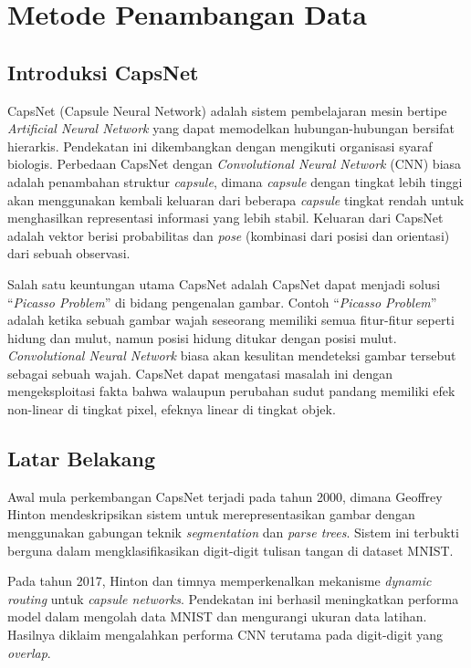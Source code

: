 \documentclass{article}
\begin{document}
   \section{Metode Penambangan Data}
   	\subsection{Introduksi CapsNet}
   	CapsNet (Capsule Neural Network) adalah sistem pembelajaran mesin bertipe \textit{Artificial Neural Network} yang dapat memodelkan hubungan-hubungan bersifat hierarkis. Pendekatan ini dikembangkan dengan mengikuti organisasi syaraf biologis. Perbedaan CapsNet dengan \textit{Convolutional Neural Network} (CNN) biasa adalah penambahan struktur \textit{capsule}, dimana \textit{capsule} dengan tingkat lebih tinggi akan menggunakan kembali keluaran dari beberapa \textit{capsule} tingkat rendah untuk menghasilkan representasi informasi yang lebih stabil. Keluaran dari CapsNet adalah vektor berisi probabilitas dan \textit{pose} (kombinasi dari posisi dan orientasi) dari sebuah observasi. \par
   	Salah satu keuntungan utama CapsNet adalah CapsNet dapat menjadi solusi “\textit{Picasso Problem}” di bidang pengenalan gambar. Contoh “\textit{Picasso Problem}” adalah ketika sebuah gambar wajah seseorang memiliki semua fitur-fitur seperti hidung dan mulut, namun posisi hidung ditukar dengan posisi mulut. \textit{Convolutional Neural Network} biasa akan kesulitan mendeteksi gambar tersebut sebagai sebuah wajah. CapsNet dapat mengatasi masalah ini dengan mengeksploitasi fakta bahwa walaupun perubahan sudut pandang memiliki efek non-linear di tingkat pixel, efeknya linear di tingkat objek.
   	
   	\subsection{Latar Belakang}
   	Awal mula perkembangan CapsNet terjadi pada tahun 2000, dimana Geoffrey Hinton mendeskripsikan sistem untuk merepresentasikan gambar dengan menggunakan gabungan teknik \textit{segmentation} dan \textit{parse trees}. Sistem ini terbukti berguna dalam mengklasifikasikan digit-digit tulisan tangan di dataset MNIST. \par
   	Pada tahun 2017, Hinton dan timnya memperkenalkan mekanisme \textit{dynamic routing} untuk \textit{capsule networks}. Pendekatan ini berhasil meningkatkan performa model dalam mengolah data MNIST dan mengurangi ukuran data latihan. Hasilnya diklaim mengalahkan performa CNN terutama pada digit-digit yang \textit{overlap}.
   	
\end{document}

